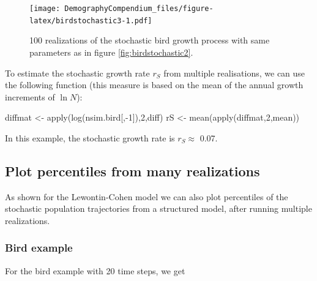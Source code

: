 \documentclass[
]{book}
\newenvironment{Shaded}{\begin{snugshade}}{\end{snugshade}}
\newcommand{\DecValTok}[1]{\textcolor[rgb]{0.00,0.00,0.81}{#1}}
\newcommand{\FunctionTok}[1]{\textcolor[rgb]{0.00,0.00,0.00}{#1}}
\newcommand{\NormalTok}[1]{#1}
\newcommand{\OtherTok}[1]{\textcolor[rgb]{0.56,0.35,0.01}{#1}}
\newcommand{\SpecialCharTok}[1]{\textcolor[rgb]{0.00,0.00,0.00}{#1}}
\begin{document}
\begin{figure}
\centering
\texttt{[image: DemographyCompendium\_files/figure-latex/birdstochastic3-1.pdf]}
\caption{\label{fig:birdstochastic3}100 realizations of the stochastic bird growth process with same parameters as in figure \ref{fig:birdstochastic2}.}
\end{figure}

To estimate the stochastic growth rate \(r_S\) from multiple realisations, we can use the following function (this measure is based on the mean of the annual growth increments of \(\ln N\)):

\begin{Shaded}
\begin{Highlighting}[]
\NormalTok{diffmat }\OtherTok{\textless{}{-}} \FunctionTok{apply}\NormalTok{(}\FunctionTok{log}\NormalTok{(nsim.bird[,}\SpecialCharTok{{-}}\DecValTok{1}\NormalTok{]),}\DecValTok{2}\NormalTok{,diff)}
\NormalTok{rS }\OtherTok{\textless{}{-}} \FunctionTok{mean}\NormalTok{(}\FunctionTok{apply}\NormalTok{(diffmat,}\DecValTok{2}\NormalTok{,mean))}
\end{Highlighting}
\end{Shaded}

In this example, the stochastic growth rate is \(r_S\approx\) 0.07.

\hypertarget{plot-percentiles-from-many-realizations-1}{%
\subsection*{Plot percentiles from many realizations}\label{plot-percentiles-from-many-realizations-1}}

As shown for the Lewontin-Cohen model we can also plot percentiles of the stochastic population trajectories from a structured model, after running multiple realizations.

\hypertarget{bird-example-19}{%
\subsubsection*{Bird example}\label{bird-example-19}}

For the bird example with 20 time steps, we get
\end{document}
